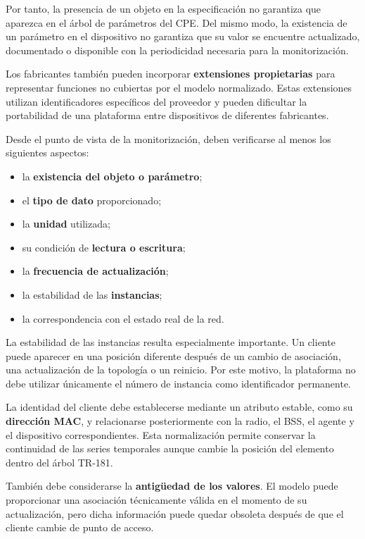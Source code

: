 Por tanto, la presencia de un objeto en la especificación no garantiza
que aparezca en el árbol de parámetros del CPE. Del mismo modo, la
existencia de un parámetro en el dispositivo no garantiza que su valor se
encuentre actualizado, documentado o disponible con la periodicidad
necesaria para la monitorización.

Los fabricantes también pueden incorporar
\textbf{extensiones propietarias} para representar funciones no cubiertas
por el modelo normalizado. Estas extensiones utilizan identificadores
específicos del proveedor y pueden dificultar la portabilidad de una
plataforma entre dispositivos de diferentes fabricantes.

Desde el punto de vista de la monitorización, deben verificarse al menos
los siguientes aspectos:

\begin{itemize}
    \item la \textbf{existencia del objeto o parámetro};
    \item el \textbf{tipo de dato} proporcionado;
    \item la \textbf{unidad} utilizada;
    \item su condición de \textbf{lectura o escritura};
    \item la \textbf{frecuencia de actualización};
    \item la estabilidad de las \textbf{instancias};
    \item la correspondencia con el estado real de la red.
\end{itemize}

La estabilidad de las instancias resulta especialmente importante. Un
cliente puede aparecer en una posición diferente después de un cambio de
asociación, una actualización de la topología o un reinicio. Por este
motivo, la plataforma no debe utilizar únicamente el número de instancia
como identificador permanente.

La identidad del cliente debe establecerse mediante un atributo estable,
como su \textbf{dirección MAC}, y relacionarse posteriormente con la
radio, el BSS, el agente y el dispositivo correspondientes. Esta
normalización permite conservar la continuidad de las series temporales
aunque cambie la posición del elemento dentro del árbol TR-181.

También debe considerarse la \textbf{antigüedad de los valores}. El
modelo puede proporcionar una asociación técnicamente válida en el
momento de su actualización, pero dicha información puede quedar
obsoleta después de que el cliente cambie de punto de acceso.

